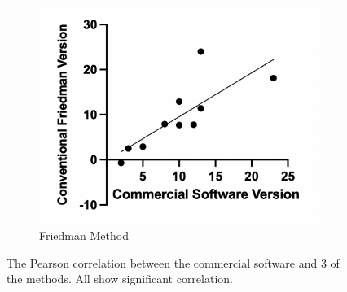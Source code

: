 \begin{figure}
\begin{center}
\begin{subfigure}[b]{0.30\linewidth}
		\end{subfigure}
		\begin{subfigure}[b]{0.30\linewidth}
			\includegraphics[width=\linewidth]{figures/friedman.png}
			\caption{Friedman Method}
		\end{subfigure}
		\caption{\label{fig:correl}The Pearson correlation between the commercial software and 3 of the methods. All show significant correlation.}
	\end{center}
\end{figure}
